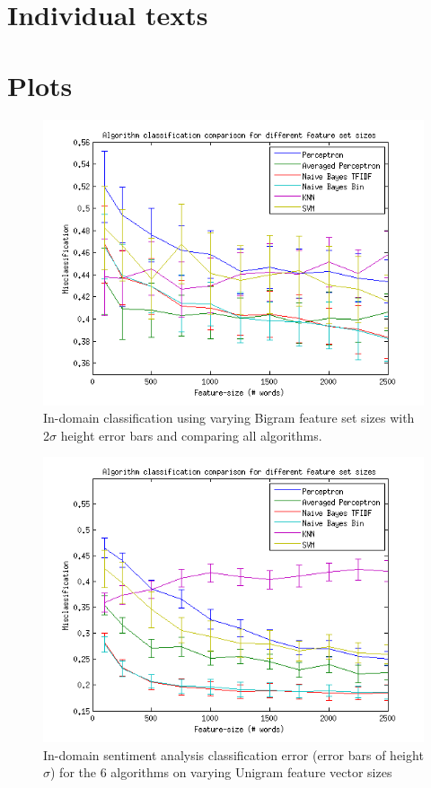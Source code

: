 \chapter{Individual texts}




\chapter{Plots}
\begin{figure}[H]
\centering
\includegraphics[scale = 1]{../Plottar/feature-size100-2500bigram.png}
\caption{In-domain classification using varying Bigram feature set sizes with 2$\sigma$ height error bars and comparing all algorithms.}
\end{figure} 

\begin{figure}[H]
\centering
\includegraphics[scale = 1]{../Plottar/feature-size100-2500all.png}
\caption{In-domain sentiment analysis classification error (error bars of height $\sigma$) for the 6 algorithms on varying Unigram feature vector sizes}
\end{figure} 

